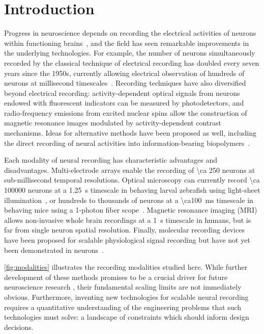 \section{Introduction}
Progress in neuroscience depends on recording the electrical activities of neurons within functioning brains~\cite{alivisatos2012brain, bansal2012decoding}, and  the field has seen remarkable improvements in the underlying technologies. For example, the number of neurons simultaneously recorded by the classical technique of electrical recording has doubled every seven years since the 1950s, currently allowing electrical observation of hundreds of neurons at millisecond timescales~\cite{stevenson11}. Recording techniques have also diversified beyond electrical recording: activity-dependent optical signals from neurons endowed with fluorescent indicators can be measured by photodetectors, and radio-frequency emissions from excited nuclear spins allow the construction of magnetic resonance images modulated by activity-dependent contrast mechanisms.
Ideas for alternative methods have been proposed as well, including the direct recording of neural activities into information-bearing biopolymers~\cite{zamft12,glaser13,kording11a}.

Each modality of neural recording has characteristic advantages and disadvantages.
Multi-electrode arrays enable the recording of \num{\ca 250} neurons at sub-millisecond temporal resolutions.
Optical microscopy can currently record \num{\ca 100000} neurons at a \SI{1.25}{\second} timescale in behaving larval zebrafish using light-sheet illumination~\cite{ahrens13}, or hundreds to thousands of neurons at a \SI{\ca100}{\milli\second} timescale in behaving mice using a 1-photon fiber scope~\cite{ziv13}.
Magnetic resonance imaging (MRI) allows non-invasive whole brain recordings at a \SI{1}{\second} timescale in humans, but is far from single neuron spatial resolution.
Finally, molecular recording devices have been proposed for scalable physiological signal recording but have not yet been demonstrated in neurons~\cite{zamft12,glaser13,kording11a}.

\autoref{fig:modalities} illustrates the recording modalities studied here.
While further development of these methods promises to be a crucial driver for future neuroscience research \cite{NeuroscienceThinksBigAndCollaboratively}, their fundamental scaling limits are not immediately obvious. Furthermore, inventing new technologies for scalable neural recording requires a quantitative understanding of the engineering problems that such technologies must solve: a landscape of constraints which should inform design decisions.

